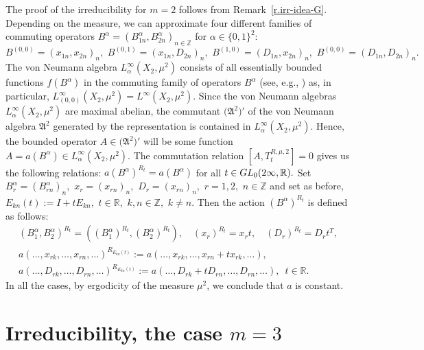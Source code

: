 \documentclass[preprint,12pt]{elsarticle}
\numberwithin{equation}{section}
\begin{document}
The proof of  the irreducibility for $m=2$ follows  from
Remark~\ref{r.irr-idea-G}. Depending on the measure, we can
approximate four different families of commuting operators
$B^\alpha=(B^\alpha_{1n},B^\alpha_{2n})_{n\in{\mathbb Z}}$ for
$\alpha\in \{0,1\}^2$:
$$
B^{(0,0)}\!\!=\!\!(x_{1n},x_{2n})_{n},\,\,B^{(0,1)}\!\!=\!\!(x_{1n},D_{2n})_{n},\,\,
B^{(1,0)}\!\!=\!\!(D_{1n},x_{2n})_{n},\,\,B^{(0,0)}\!\!=\!\!(D_{1n},D_{2n})_{n}.
$$
The von Neumann algebra $L^\infty_\alpha(X_2,\mu^2)$ consists of
all essentially bounded functions $f(B^\alpha)$ in the commuting
family of operators $B^\alpha$ (see, e.g., \cite{Ber86}) as, in
particular, $L^\infty_{(0,0)}(X_2,\mu^2)=L^\infty(X_2,\mu^2)$.
Since the von Neumann algebras $L^\infty_\alpha(X_2,\mu^2)$ are
maximal abelian, the commutant $\big({\mathfrak A}^2\big)'$ of the
von Neumann algebra ${\mathfrak A}^2$ generated by the
representation is contained in  $L^\infty_\alpha(X_2,\mu^2)$.
Hence, the bounded operator $A\in \big({\mathfrak A}^2\big)'$ will
be some function $A=a(B^\alpha)\in L^\infty_\alpha(X_2,\mu^2)$.
The commutation relation $[A,T^{R,\mu,2}_t]=0$ gives us the
following relations:
%
$a(B^\alpha)^{R_t}=a(B^\alpha)$ for all $t\in {\rm
GL}_0(2\infty,{\mathbb R}).$
%
Set $B^\alpha_r=(B^\alpha_{rn})_n,\,\,x_r=(x_{rn})_n,\,\,D_r=(x_{rn})_n,\,\,r=1,2,\,\,n\in{\mathbb
Z}$ and set as before, $E_{kn}(t):=I+tE_{kn},\,\,t\in {\mathbb R},\,\,k,n\in
{\mathbb Z},\,\,k\not=n$. Then the action $(B^\alpha)^{R_t}$ is
defined as follows:
%
\begin{eqnarray*}
(B^\alpha_1,B^\alpha_2)^{R_t}=((B^\alpha_1)^{R_t},(B^\alpha_2)^{R_t}),\quad (x_r)^{R_t}=x_rt,\quad (D_r)^{R_t}=D_rt^T,\\
a(\dots, x_{rk},\dots ,x_{rn},\dots)^{R_{E_{kn}(t)}}:=a(\dots, x_{rk},\dots ,x_{rn}+tx_{rk},\dots),\\
a(\dots, D_{rk},\dots ,D_{rn},\dots)^{R_{E_{kn}(t)}}:=a(\dots, D_{rk}+tD_{rn},\dots ,D_{rn},\dots),\,\,\,t\in {\mathbb R}.
\end{eqnarray*}
%
In all the cases, by ergodicity of the measure $\mu^2$, we conclude that $a$ is constant.
%
\section{Irreducibility, the case $m=3$}
\label{sec.Irr.m=3}
\end{document}
